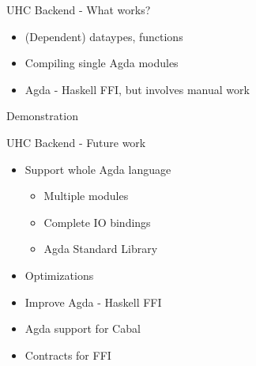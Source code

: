 \begin{frame}{UHC Backend - What works?}
\begin{itemize}
\item (Dependent) dataypes, functions
\item Compiling single Agda modules
\item Agda - Haskell FFI, but involves manual work
\end{itemize}
\end{frame}

\begin{frame}
Demonstration
\end{frame}

\begin{frame}{UHC Backend - Future work}
\begin{itemize}
\item Support whole Agda language
  \begin{itemize}
  \item Multiple modules
  \item Complete IO bindings
  \item Agda Standard Library
  \end{itemize}
\item Optimizations
\item Improve Agda - Haskell FFI
\item Agda support for Cabal
\item Contracts for FFI
\end{itemize}
\end{frame}
